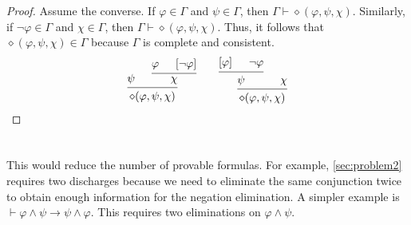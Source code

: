 \documentclass[a4paper]{article}
\begin{document}
\begin{itemize}
\begin{proof}
    Assume the converse.
    If $\varphi \in \Gamma$ and $\psi \in \Gamma$, then $\Gamma \vdash \diamond(\varphi,\psi,\chi)$.
    Similarly, if $\lnot\varphi \in \Gamma$ and $\chi \in \Gamma$, then $\Gamma \vdash \diamond(\varphi,\psi,\chi)$.
    Thus, it follows that $\diamond(\varphi,\psi,\chi) \in \Gamma$ because $\Gamma$ is complete and consistent.
    \[
      \begin{prooftree}
        \hypo{\psi}
        \hypo{\varphi}
        \hypo{[\lnot\varphi]}
        \infer2{\chi}
        \infer2{\diamond(\varphi,\psi,\chi)}
      \end{prooftree}
      \qquad
      \begin{prooftree}
        \hypo{[\varphi]}
        \hypo{\lnot \varphi}
        \infer2{\psi}
        \hypo{\chi}
        \infer2{\diamond(\varphi,\psi,\chi)}
      \end{prooftree}
    \]
  \end{proof}
\end{itemize}

\section{}
This would reduce the number of provable formulas.
For example, \cref{sec:problem2} requires two discharges because we need to eliminate the same conjunction twice to obtain enough information for the negation elimination.
A simpler example is $\vdash \varphi \wedge \psi \to \psi \wedge \varphi$.
This requires two eliminations on $\varphi \wedge \psi$.

\end{document}
